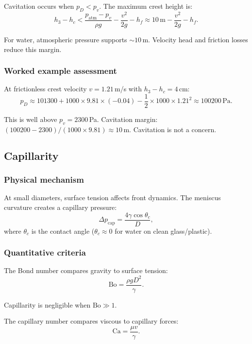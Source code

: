 \documentclass[11pt]{article}
\begin{document}
Cavitation occurs when $p_D < p_v$. The maximum crest height is:
\begin{equation}
  h_3 - h_c < \frac{p_{\text{atm}} - p_v}{\rho g} - \frac{v^2}{2g} - h_f \approx 10\,\text{m} - \frac{v^2}{2g} - h_f.
  \label{eq:cavitation-criterion}
\end{equation}

For water, atmospheric pressure supports $\sim 10$\,m. Velocity head and friction losses reduce this margin.

\subsubsection{Worked example assessment}

At frictionless crest velocity $v = 1.21$\,m/s with $h_3 - h_c = 4$\,cm:
\[
  p_D \approx 101300 + 1000 \times 9.81 \times (-0.04) - \frac{1}{2} \times 1000 \times 1.21^2 \approx 100200\,\text{Pa}.
\]

This is well above $p_v = 2300$\,Pa. Cavitation margin: $(100200 - 2300)/(1000 \times 9.81) \approx 10$\,m. Cavitation is not a concern.

\subsection{Capillarity}

\subsubsection{Physical mechanism}

At small diameters, surface tension affects front dynamics. The meniscus curvature creates a capillary pressure:
\[
  \Delta p_{\text{cap}} = \frac{4\gamma\cos\theta_c}{D},
\]
where $\theta_c$ is the contact angle ($\theta_c \approx 0$ for water on clean glass/plastic).

\subsubsection{Quantitative criteria}

The Bond number compares gravity to surface tension:
\begin{equation}
  \text{Bo} = \frac{\rho g D^2}{\gamma}.
  \label{eq:bond}
\end{equation}

Capillarity is negligible when $\text{Bo} \gg 1$.

The capillary number compares viscous to capillary forces:
\begin{equation}
  \text{Ca} = \frac{\mu v}{\gamma}.
  \label{eq:capillary}
\end{equation}
\end{document}
